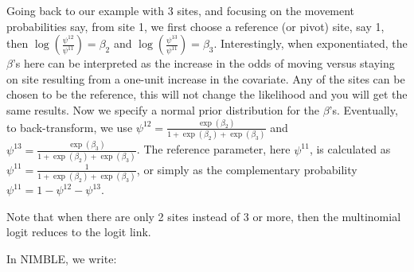 \documentclass[
  12pt,
]{krantz}
\begin{document}
Going back to our example with \(3\) sites, and focusing on the movement probabilities say, from site 1, we first choose a reference (or pivot) site, say 1, then \(\log\left(\displaystyle{\frac{\psi^{12}}{\psi^{11}}}\right) = \beta_2\) and \(\log\left(\displaystyle{\frac{\psi^{13}}{\psi^{11}}}\right) = \beta_3\). Interestingly, when exponentiated, the \(\beta\)'s here can be interpreted as the increase in the odds of moving versus staying on site resulting from a one-unit increase in the covariate. Any of the sites can be chosen to be the reference, this will not change the likelihood and you will get the same results. Now we specify a normal prior distribution for the \(\beta\)'s. Eventually, to back-transform, we use \(\psi^{12} = \displaystyle{\frac{\exp(\beta_2)}{1+\displaystyle{\exp(\beta_2)+\displaystyle{\exp(\beta_3)}}}}\) and \(\psi^{13} = \displaystyle{\frac{\exp(\beta_3)}{1+\displaystyle{\exp(\beta_2)+\displaystyle{\exp(\beta_3)}}}}\). The reference parameter, here \(\psi^{11}\), is calculated as \(\psi^{11} = \displaystyle{\frac{1}{1 + \displaystyle{\exp(\beta_2)+\displaystyle{\exp(\beta_3)}}}}\), or simply as the complementary probability \(\psi^{11} = 1 - \psi^{12} - \psi^{13}\).

Note that when there are only 2 sites instead of 3 or more, then the multinomial logit reduces to the logit link.

In NIMBLE, we write:
\end{document}
